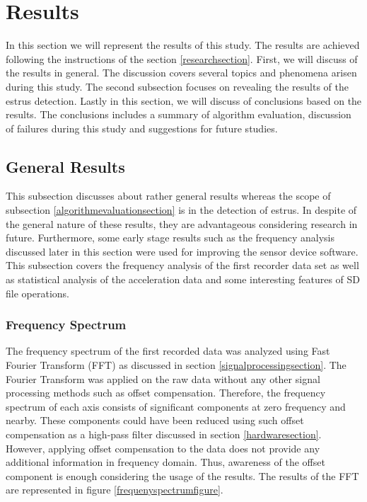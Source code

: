 \documentclass[english,12pt,a4paper,pdftex,elec,utf8]{aaltothesis}
\begin{document}
\clearpage

\section{Results} \label{resultssection}
 
In this section we will represent the results of this study. The results are achieved following the instructions of the section \ref{researchsection}. First, we will discuss of the results in general. The discussion covers several topics and phenomena arisen during this study. The second subsection focuses on revealing the results of the estrus detection. Lastly in this section, we will discuss of conclusions based on the results. The conclusions includes a summary of algorithm evaluation, discussion of failures during this study and suggestions for future studies.



\subsection{General Results} \label{generalreviewsection}

This subsection discusses about rather general results whereas the scope of subsection \ref{algorithmevaluationsection} is in the detection of estrus. In despite of the general nature of these results, they are advantageous considering research in future. Furthermore, some early stage results such as the frequency analysis discussed later in this section were used for improving the sensor device software. This subsection covers the frequency analysis of the first recorder data set as well as statistical analysis of the acceleration data and some interesting features of SD file operations. \\






\subsubsection{Frequency Spectrum}

The frequency spectrum of the first recorded data was analyzed using Fast Fourier Transform (FFT) as discussed in section \ref{signalprocessingsection}. The Fourier Transform was applied on the raw data without any other signal processing methods such as offset compensation. Therefore, the frequency spectrum of each axis consists of significant components at zero frequency and nearby. These components could have been reduced using such offset compensation as a high-pass filter discussed in section \ref{hardwaresection}. However, applying offset compensation to the data does not provide any additional information in frequency domain. Thus, awareness of the offset component is enough considering the usage of the results. The results of the FFT are represented in figure \ref{frequenyspectrumfigure}. \\
\end{document}
